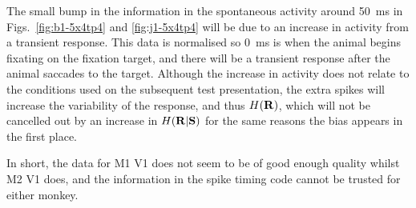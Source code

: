 The small bump in the information in the spontaneous activity around \SI{50}{ms} in Figs.~\ref{fig:b1-5x4tp4} and \ref{fig:j1-5x4tp4} will be due to an increase in activity from a transient response.
This data is normalised so \SI{0}{ms} is when the animal begins fixating on the fixation target, and there will be a transient response after the animal saccades to the target.
Although the increase in activity does not relate to the conditions used on the subsequent test presentation, the extra spikes will increase the variability of the response, and thus $H(\mathbf{R})$, which will not be cancelled out by an increase in $H(\mathbf{R}|\mathbf{S})$ for the same reasons the bias appears in the first place.

In short, the data for \ac{M1} \ac{V1} does not seem to be of good enough quality whilst \ac{M2} \ac{V1} does, and the information in the spike timing code cannot be trusted for either monkey.



